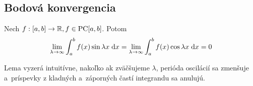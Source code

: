 
\subsection{Bodová konvergencia}
\begin{lema}
    Nech $f: [a,b]\rightarrow {\mathbb R}, f\in \mbox{PC}[a,b]$. Potom
    \begin{equation*}
        \lim_{\lambda\rightarrow\infty} \int_a^b f(x) \sin \lambda x \; \mathrm{d} x=
        \lim_{\lambda\rightarrow\infty} \int_a^b f(x) \cos \lambda x \; \mathrm{d} x=
        0
    \end{equation*}
\end{lema}
%
\begin{dokaz}
    Lema vyzerá intuitívne, nakoľko ak zväčšujeme $\lambda$,
    perióda oscilácií sa zmenšuje a~príspevky
    z kladných a~záporných častí integrandu sa anulujú.
%
    \def\pil{\pi/\lambda}


\end{dokaz}
